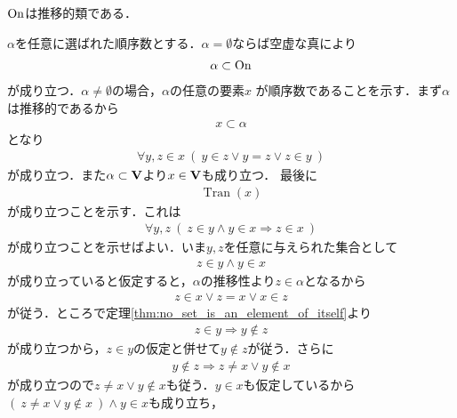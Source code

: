 	\begin{screen}
		\begin{thm}[順序数全体は推移的]\label{thm:On_is_transitive}
			$\mathrm{On}$は推移的類である．
		\end{thm}
	\end{screen}
	
	\begin{prf} 
		$\alpha$を任意に選ばれた順序数とする．$\alpha = \emptyset$ならば空虚な真により
				\begin{align}
					\alpha \subset \mathrm{On}
				\end{align}
				が成り立つ．$\alpha \neq \emptyset$の場合，$\alpha$の任意の要素$x$
				が順序数であることを示す．まず$\alpha$は推移的であるから
				\begin{align}
					x \subset \alpha
				\end{align}
				となり
				\begin{align}
					\forall y,z \in x\ (\ y \in z \vee y = z \vee z \in y\ )
				\end{align}
				が成り立つ．また$\alpha \subset \mathbf{V}$より$x \in \mathbf{V}$も成り立つ．
				最後に
				\begin{align}
					\operatorname{Tran}(x)
				\end{align}
				が成り立つことを示す．これは
				\begin{align}
					\forall y,z\ (\ z \in y \wedge y \in x
					\Longrightarrow z \in x \ )
					\label{eq:thm_On_is_transitive_1}
				\end{align}
				が成り立つことを示せばよい．いま$y,z$を任意に与えられた集合として
				\begin{align}
					z \in y \wedge y \in x
				\end{align}
				が成り立っていると仮定すると，$\alpha$の推移性より$z \in \alpha$となるから
				\begin{align}
					z \in x \vee z = x \vee x \in z
				\end{align}
				が従う．ところで定理\ref{thm:no_set_is_an_element_of_itself}より
				\begin{align}
					z \in y \Longrightarrow y \notin z
				\end{align}
				が成り立つから，$z \in y$の仮定と併せて$y \notin z$が従う．さらに
				\begin{align}
					y \notin z \Longrightarrow z \neq x \vee y \notin x
				\end{align}
				が成り立つので$z \neq x \vee y \notin x$も従う．$y \in x$も仮定しているから
				$(\ z \neq x \vee y \notin x\ ) \wedge y \in x$も成り立ち，
				\begin{align}

\end{align}
\end{prf}
